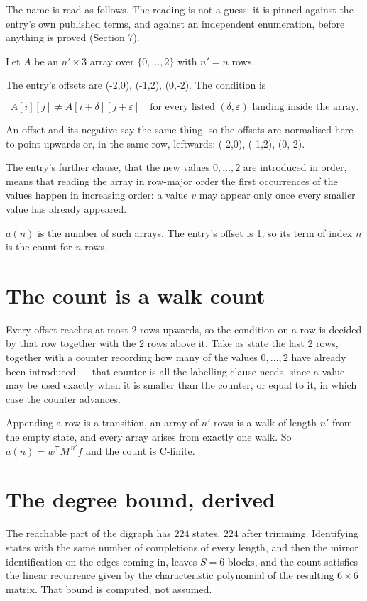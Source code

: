 \documentclass[11pt]{article}
\theoremstyle{definition}
\begin{document}
The name is read as follows. The reading is not a guess: it is pinned against the entry's own published terms, and against an independent enumeration, before anything is proved (Section 7).

Let $A$ be an $n' \times 3$ array over $\{0,\dots,2\}$ with $n' = n$ rows.

The entry's offsets are (-2,0), (-1,2), (0,-2). The condition is

\[A[i][j] \ne A[i{+}\delta][j{+}\varepsilon]\quad\text{for every listed }(\delta,\varepsilon)\text{ landing inside the array.}\]

An offset and its negative say the same thing, so the offsets are normalised here to point upwards or, in the same row, leftwards: (-2,0), (-1,2), (0,-2).

The entry's further clause, that the new values $0,\dots,2$ are introduced in order, means that reading the array in row-major order the first occurrences of the values happen in increasing order: a value $v$ may appear only once every smaller value has already appeared.

$a(n)$ is the number of such arrays. The entry's offset is 1, so its term of index $n$ is the count for $n$ rows.

\section{The count is a walk count}

Every offset reaches at most $2$ rows upwards, so the condition on a row is decided by that row together with the $2$ rows above it. Take as state the last $2$ rows, together with a counter recording how many of the values $0,\dots,2$ have already been introduced --- that counter is all the labelling clause needs, since a value may be used exactly when it is smaller than the counter, or equal to it, in which case the counter advances.

Appending a row is a transition, an array of $n'$ rows is a walk of length $n'$ from the empty state, and every array arises from exactly one walk. So $a(n) = w^{\mathsf T}M^{\,n'}f$ and the count is C-finite.

\section{The degree bound, derived}

The reachable part of the digraph has $224$ states, $224$ after trimming. Identifying states with the same number of completions of every length, and then the mirror identification on the edges coming in, leaves $S = 6$ blocks, and the count satisfies the linear recurrence given by the characteristic polynomial of the resulting $6\times6$ matrix. That bound is computed, not assumed.
\end{document}
